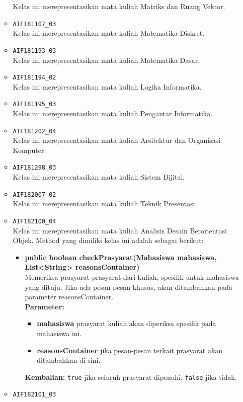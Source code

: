 \begin{enumerate}
\begin{itemize}
		Kelas ini merepresentasikan mata kuliah Matriks dan Ruang Vektor.
		\item \texttt{AIF181107\_03} \\
		Kelas ini merepresentasikan mata kuliah Matematika Diskret.
		\item \texttt{AIF181193\_03} \\
		Kelas ini merepresentasikan mata kuliah Matematika Dasar.
		\item \texttt{AIF181194\_02} \\
		Kelas ini merepresentasikan mata kuliah Logika Informatika.
		\item \texttt{AIF181195\_03} \\
		Kelas ini merepresentasikan mata kuliah Pengantar Informatika.
		\item \texttt{AIF181202\_04} \\
		Kelas ini merepresentasikan mata kuliah Arsitektur dan Organisasi Komputer.
		\item \texttt{AIF181298\_03} \\
		Kelas ini merepresentasikan mata kuliah Sistem Dijital.
		\item \texttt{AIF182007\_02} \\
		Kelas ini merepresentasikan mata kuliah Teknik Presentasi.
		\item \texttt{AIF182100\_04} \\
		Kelas ini merepresentasikan mata kuliah Analisis Desain Berorientasi Objek. Method yang dimiliki kelas ini adalah sebagai berikut: 
		\begin{itemize}
			\item \textbf{public boolean checkPrasyarat(Mahasiswa mahasiswa, List<String> reasonsContainer)}\\
			Memeriksa prasyarat-prasyarat dari kuliah, spesifik untuk mahasiswa yang dituju. Jika ada pesan-pesan khusus, akan ditambahkan pada parameter reasonsContainer.\\
			\textbf{Parameter:}
			\begin{itemize}
				\item \textbf{mahasiswa} prasyarat kuliah akan diperiksa spesifik pada mahasiswa ini.
				\item \textbf{reasonsContainer} jika pesan-pesan terkait prasyarat akan ditambahkan di sini.
			\end{itemize}
			\textbf{Kembalian:} \texttt{true} jika seluruh prasyarat dipenuhi, \texttt{false} jika tidak.
		\end{itemize}
		\item \texttt{AIF182101\_03} \\

\end{itemize}
\end{enumerate}

